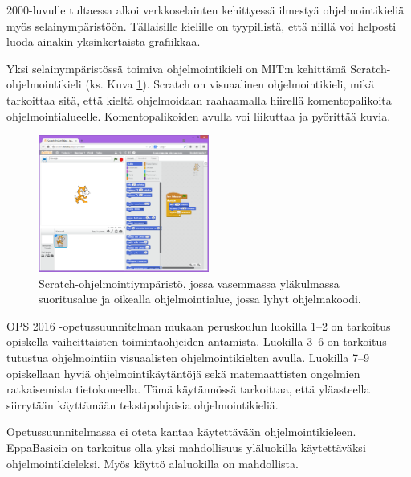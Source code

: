 2000-luvulle tultaessa alkoi
verkkoselainten kehittyessä
ilmestyä ohjelmointikieliä
myös selainympäristöön.
Tällaisille kielille on tyypillistä,
että niillä voi helposti luoda
ainakin yksinkertaista grafiikkaa.

Yksi selainympäristössä toimiva
ohjelmointikieli on
MIT:n kehittämä
Scratch-ohjelmoin\-ti\-kieli
\cite{scratch}
(ks. Kuva \ref{img:scratch}).
Scratch on visuaalinen ohjelmointikieli,
mikä tarkoittaa sitä, että
kieltä ohjelmoidaan raahaamalla
hiirellä komentopalikoita
ohjelmointialueelle.
Komentopalikoiden avulla
voi liikuttaa ja pyörittää
kuvia.

\begin{figure}[h]
    \centering
    \includegraphics[width=0.5\textwidth]{scratch}
    \caption{Scratch-ohjelmointiympäristö, jossa vasemmassa yläkulmassa suoritusalue ja oikealla ohjelmointialue, jossa lyhyt ohjelmakoodi.}
    \label{img:scratch}
\end{figure}

OPS 2016 -opetussuunnitelman
mukaan peruskoulun luokilla
1--2 on tarkoitus opiskella
vaiheittaisten toimintaohjeiden
antamista.
Luokilla 3--6 on tarkoitus
tutustua ohjelmointiin
visuaalisten ohjelmointikielten
avulla.
Luokilla 7--9 opiskellaan
hyviä ohjelmointikäytäntöjä
sekä matemaattisten ongelmien
ratkaisemista tietokoneella.
\cite{OPS_2016}
Tämä käytännössä tarkoittaa,
että yläasteella siirrytään
käyttämään tekstipohjaisia
ohjelmointikieliä.

Opetussuunnitelmassa ei
oteta kantaa käytettävään
ohjelmointikieleen.
EppaBasicin on tarkoitus olla
yksi mahdollisuus yläluokilla
käytettäväksi ohjelmointikieleksi.
Myös käyttö alaluokilla on
mahdollista.